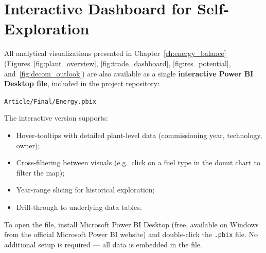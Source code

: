 
\chapter{Interactive Dashboard for Self-Exploration}
\label{app:dashboard}

All analytical visualizations presented in Chapter~\ref{ch:energy_balance}
(Figures~\ref{fig:plant_overview}, \ref{fig:trade_dashboard},
\ref{fig:res_potential}, and~\ref{fig:decom_outlook}) are also available
as a single \textbf{interactive Power BI Desktop file},
included in the project repository:

\begin{center}
    \texttt{Article/Final/Energy.pbix}
\end{center}

The interactive version supports:
\begin{itemize}
    \item Hover-tooltips with detailed plant-level data
        (commissioning year, technology, owner);
    \item Cross-filtering between visuals
        (e.g.\ click on a fuel type in the donut chart to filter the map);
    \item Year-range slicing for historical exploration;
    \item Drill-through to underlying data tables.
\end{itemize}

To open the file, install Microsoft Power BI Desktop (free, available on
Windows from the official Microsoft Power BI website) and double-click the
\texttt{.pbix} file. No additional setup is required --- all data is
embedded in the file.
